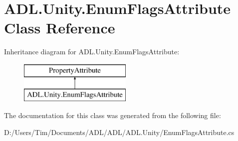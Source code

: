 \hypertarget{class_a_d_l_1_1_unity_1_1_enum_flags_attribute}{}\section{A\+D\+L.\+Unity.\+Enum\+Flags\+Attribute Class Reference}
\label{class_a_d_l_1_1_unity_1_1_enum_flags_attribute}
Inheritance diagram for A\+D\+L.\+Unity.\+Enum\+Flags\+Attribute\+:\begin{figure}[H]
\begin{center}
\leavevmode
\includegraphics[height=2.000000cm]{class_a_d_l_1_1_unity_1_1_enum_flags_attribute}
\end{center}
\end{figure}


The documentation for this class was generated from the following file\+:\begin{DoxyCompactItemize}
\item 
D\+:/\+Users/\+Tim/\+Documents/\+A\+D\+L/\+A\+D\+L/\+A\+D\+L.\+Unity/Enum\+Flags\+Attribute.\+cs\end{DoxyCompactItemize}

